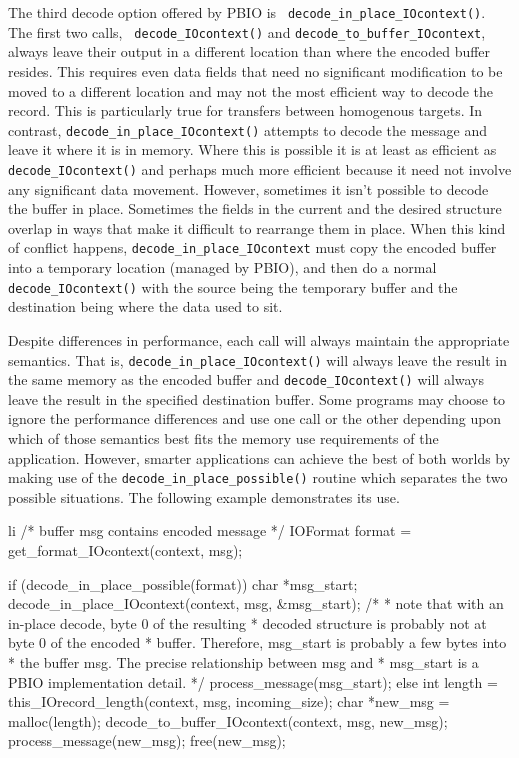 \documentclass{article}
\begin{document}
The third decode option offered by PBIO is {\tt
decode\_in\_place\_IOcontext()}.  The first two calls, {\tt
decode\_IOcontext()} and {\tt decode\_to\_buffer\_IOcontext}, always leave
their output in a different location than where the encoded buffer resides.
This requires even data fields that need no significant modification to be
moved to a different location and may not the most efficient way to decode the
record.  This is particularly true for transfers between homogenous targets.
In contrast, {\tt decode\_in\_place\_IOcontext()} attempts to decode the
message and leave it where it is in memory.  Where this is possible it is at
least as efficient as {\tt decode\_IOcontext()} and perhaps much more
efficient because it need not involve any significant data movement.  However,
sometimes it isn't possible to decode the buffer in place.  Sometimes the
fields in the current and the desired structure overlap in ways that make it
difficult to rearrange them in place.  When this kind of conflict happens,
{\tt decode\_in\_place\_IOcontext} must copy the encoded buffer into a
temporary location (managed by PBIO), and then do a normal {\tt
decode\_IOcontext()} with the source being the temporary buffer and the
destination being where the data used to sit.

Despite differences in performance, each call will always maintain the
appropriate semantics.
That is, {\tt decode\_in\_place\_IOcontext()} will always leave the result in
the same memory as the encoded buffer and {\tt decode\_IOcontext()} will
always leave the result in the specified destination buffer.  Some programs
may choose to ignore the performance differences and use one call or the other
depending upon which of those semantics best fits the memory use requirements
of the application.  However, smarter applications can achieve the best of
both worlds by making use of the {\tt decode\_in\_place\_possible()} routine
which separates the two possible situations.  The following example
demonstrates its use.
\begin{code}{li}
    /* buffer msg contains encoded message */
    IOFormat format = get_format_IOcontext(context, msg);

    if (decode_in_place_possible(format)) {
        char *msg_start;
        decode_in_place_IOcontext(context, msg, &msg_start);
        /*
         * note that with an in-place decode, byte 0 of the resulting
         * decoded structure is probably not at byte 0 of the encoded
         * buffer.  Therefore, msg_start is probably a few bytes into
         * the buffer msg.  The precise relationship between msg and
         * msg_start is a PBIO implementation detail.
         */
        process_message(msg_start);
    } else {
        int length = this_IOrecord_length(context, msg, incoming_size);
        char *new_msg = malloc(length);
        decode_to_buffer_IOcontext(context, msg, new_msg);
        process_message(new_msg);
        free(new_msg);
    }

\end{code}
\end{document}
